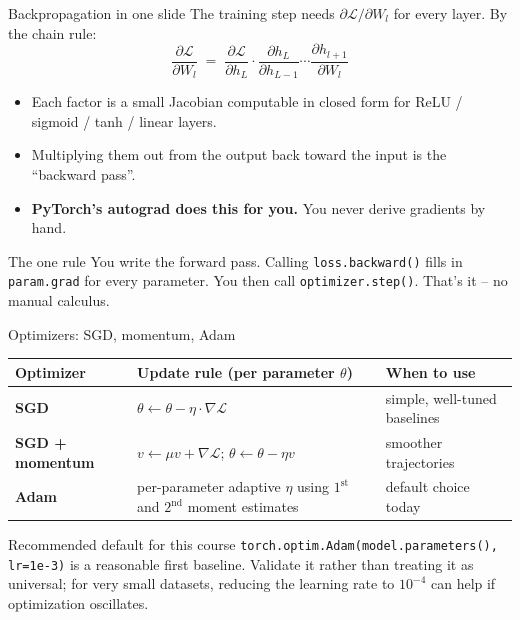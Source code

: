 \documentclass[aspectratio=169,10pt]{beamer}
\newcommand{\code}[1]{\texttt{#1}}
\begin{document}
\begin{frame}{Backpropagation in one slide}
The training step needs $\partial \mathcal{L}/\partial W_l$ for every layer. By the chain rule:
\begin{equation*}
\frac{\partial \mathcal{L}}{\partial W_l} \;=\; \frac{\partial \mathcal{L}}{\partial h_{L}} \cdot \frac{\partial h_{L}}{\partial h_{L-1}} \cdots \frac{\partial h_{l+1}}{\partial W_l}
\end{equation*}
\begin{itemize}
  \item Each factor is a small Jacobian computable in closed form for ReLU / sigmoid / tanh / linear layers.
  \item Multiplying them out from the output back toward the input is the ``backward pass''.
  \item \textbf{PyTorch's autograd does this for you.} You never derive gradients by hand.
\end{itemize}
\vspace{0.4em}
\begin{alertblock}{The one rule}
You write the forward pass. Calling \code{loss.backward()} fills in \code{param.grad} for every parameter. You then call \code{optimizer.step()}. That's it -- no manual calculus.
\end{alertblock}
\end{frame}

\begin{frame}{Optimizers: SGD, momentum, Adam}
\centering
\scriptsize
\begin{tabular}{@{}p{}p{}p{}@{}}
\toprule
Optimizer & Update rule (per parameter $\theta$) & When to use \\
\midrule
\textbf{SGD} & $\theta \leftarrow \theta - \eta \cdot \nabla \mathcal{L}$ & simple, well-tuned baselines \\
\textbf{SGD + momentum} & $v \leftarrow \mu v + \nabla \mathcal{L}$; $\theta \leftarrow \theta - \eta v$ & smoother trajectories \\
\textbf{Adam} & per-parameter adaptive $\eta$ using $1^{\text{st}}$ and $2^{\text{nd}}$ moment estimates & default choice today \\
\bottomrule
\end{tabular}
\vspace{0.6em}
\begin{block}{Recommended default for this course}
\code{torch.optim.Adam(model.parameters(), lr=1e-3)} is a reasonable first baseline. Validate it rather than treating it as universal; for very small datasets, reducing the learning rate to $10^{-4}$ can help if optimization oscillates.
\end{block}
\end{frame}
\end{document}
